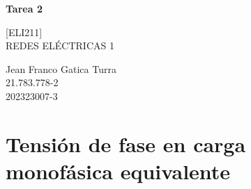 \documentclass[12pt]{article}
\begin{document}
\begin{center}
    \Huge \textbf{Tarea 2}

 \Large {[ELI211]}\\
    \large REDES ELÉCTRICAS 1
    
    \vspace{0.3cm}
    \large  
\end{center}


\begin{flushleft}
Jean Franco Gatica Turra\\
21.783.778-2\\
202323007-3\\[1em]    
\end{flushleft}



\section{Tensión de fase en carga monofásica equivalente}
\end{document}
